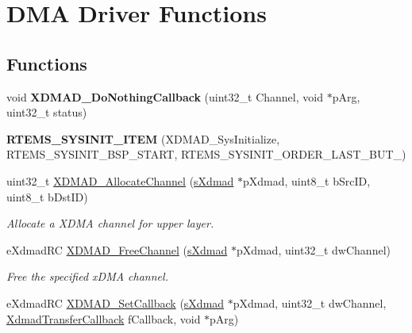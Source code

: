 \hypertarget{group__dmad__functions}{}\section{D\+MA Driver Functions}
\label{group__dmad__functions}
\subsection*{Functions}
\begin{DoxyCompactItemize}
\item 
\mbox{\label{group__dmad__functions_gadad2f699368d3790d050ca888f8a4d3c}} 
void {\bfseries X\+D\+M\+A\+D\+\_\+\+Do\+Nothing\+Callback} (uint32\+\_\+t Channel, void $\ast$p\+Arg, uint32\+\_\+t status)
\item 
\mbox{\label{group__dmad__functions_gae988be89f9ec8669acd92f0bab97b620}} 
{\bfseries R\+T\+E\+M\+S\+\_\+\+S\+Y\+S\+I\+N\+I\+T\+\_\+\+I\+T\+EM} (X\+D\+M\+A\+D\+\_\+\+Sys\+Initialize, R\+T\+E\+M\+S\+\_\+\+S\+Y\+S\+I\+N\+I\+T\+\_\+\+B\+S\+P\+\_\+\+S\+T\+A\+RT, R\+T\+E\+M\+S\+\_\+\+S\+Y\+S\+I\+N\+I\+T\+\_\+\+O\+R\+D\+E\+R\+\_\+\+L\+A\+S\+T\+\_\+\+B\+U\+T\+\_)
\item 
uint32\+\_\+t \mbox{\hyperlink{group__dmad__functions_gaafb596e6912f388050a8ff98f54b8b8f}{X\+D\+M\+A\+D\+\_\+\+Allocate\+Channel}} (\mbox{\hyperlink{group__dmad__structs_gaf2c13151514615a6beb35c0d868a5053}{s\+Xdmad}} $\ast$p\+Xdmad, uint8\+\_\+t b\+Src\+ID, uint8\+\_\+t b\+Dst\+ID)
\begin{DoxyCompactList}\small\item\em Allocate a X\+D\+MA channel for upper layer. \end{DoxyCompactList}\item 
e\+Xdmad\+RC \mbox{\hyperlink{group__dmad__functions_ga2a3178c1d2615b7a4d7a0005662cdd89}{X\+D\+M\+A\+D\+\_\+\+Free\+Channel}} (\mbox{\hyperlink{group__dmad__structs_gaf2c13151514615a6beb35c0d868a5053}{s\+Xdmad}} $\ast$p\+Xdmad, uint32\+\_\+t dw\+Channel)
\begin{DoxyCompactList}\small\item\em Free the specified x\+D\+MA channel. \end{DoxyCompactList}\item 
e\+Xdmad\+RC \mbox{\hyperlink{group__dmad__functions_gaa0af49f87c84aaa20bee1f055d31ad2d}{X\+D\+M\+A\+D\+\_\+\+Set\+Callback}} (\mbox{\hyperlink{group__dmad__structs_gaf2c13151514615a6beb35c0d868a5053}{s\+Xdmad}} $\ast$p\+Xdmad, uint32\+\_\+t dw\+Channel, \mbox{\hyperlink{group__dmad__structs_gaa36d3490b9c6967852605416acf658be}{Xdmad\+Transfer\+Callback}} f\+Callback, void $\ast$p\+Arg)

\end{DoxyCompactItemize}
